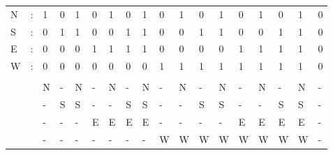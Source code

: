 \begin{table}[]
\begin{tabular}{llllllllllllllllll}
N & : & 1 & 0 & 1 & 0 & 1 & 0 & 1 & 0 & 1 & 0 & 1 & 0 & 1 & 0 & 1 & 0 \\
S & : & 0 & 1 & 1 & 0 & 0 & 1 & 1 & 0 & 0 & 1 & 1 & 0 & 0 & 1 & 1 & 0 \\
E & : & 0 & 0 & 0 & 1 & 1 & 1 & 1 & 0 & 0 & 0 & 0 & 1 & 1 & 1 & 1 & 0 \\
W & : & 0 & 0 & 0 & 0 & 0 & 0 & 0 & 1 & 1 & 1 & 1 & 1 & 1 & 1 & 1 & 0 \\
  &   &   &   &   &   &   &   &   &   &   &   &   &   &   &   &   &   \\
  &   & N & - & N & - & N & - & N & - & N & - & N & - & N & - & N & - \\
  &   & - & S & S & - & - & S & S & - & - & S & S & - & - & S & S & - \\
  &   & - & - & - & E & E & E & E & - & - & - & - & E & E & E & E & - \\
  &   & - & - & - & - & - & - & - & W & W & W & W & W & W & W & W & -
\end{tabular}
\end{table}
